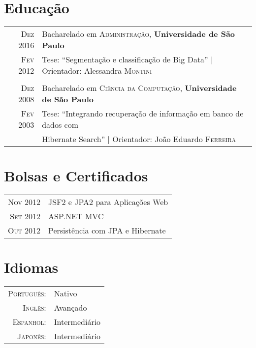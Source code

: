 \documentclass[a4paper,10pt]{article}
\begin{document}
\section{Educação}
\begin{tabular}{rl} 
 \textsc{Dez} 2016 & Bacharelado em \textsc{Administração}, \textbf{Universidade de São Paulo}\\
\textsc{Fev} 2012&Tese: ``Segmentação e classificação de Big Data'' | \small Orientador: Alessandra \textsc{Montini}\\\\
\textsc{Dez} 2008& Bacharelado em \textsc{Ciência da Computação}, \textbf{Universidade de São Paulo}\\
\textsc{Fev} 2003& Tese: ``Integrando recuperação de informação em banco de dados com \\
& Hibernate Search'' | \small Orientador: João Eduardo \textsc{Ferreira}\\
\end{tabular}

\section{Bolsas e Certificados}
\begin{tabular}{rl}
 \textsc{Nov} 2012 & JSF2 e JPA2 para Aplicações Web\\
\textsc{Set} 2012 & ASP.NET MVC\\
\textsc{Out} 2012 & Persistência com JPA e Hibernate\\
\end{tabular}

\section{Idiomas}
\begin{tabular}{rl}
 \textsc{Português:}&Nativo\\
\textsc{Inglês:}&Avançado\\
\textsc{Espanhol:}&Intermediário\\
\textsc{Japonês:}&Intermediário\\
\end{tabular}


\end{document}
